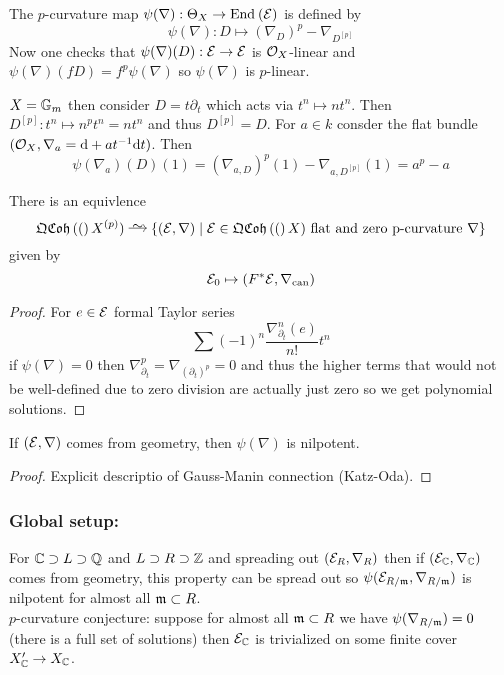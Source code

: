 \documentclass[12pt]{article}
\begin{document}
\begin{defn}
The $p$-curvature map $\psi(\nabla) : \Theta_X \to \mathrm{End}_{} \left( \mathcal{E} \right)$ is defined by
\[ \psi(\nabla) : D \mapsto (\nabla_D)^p - \nabla_{D^{[p]}} \]
Now one checks that $\psi(\nabla)(D) : \mathcal{E} \to \mathcal{E}$ is $\mathcal{O}_{X}$-linear and $\psi(\nabla)(f D) = f^p \psi(\nabla)$ so $\psi(\nabla)$ is $p$-linear.
\end{defn}

\begin{example}
$X = \mathbb{G}_m$ then consider $D = t \partial_t$ which acts via $t^n \mapsto n t^n$. Then $D^{[p]} : t^n \mapsto n^p t^n = n t^n$ and thus $D^{[p]} = D$. For $a \in k$ consder the flat bundle $(\mathcal{O}_{X}, \nabla_a = \mathrm{d} + a t^{-1} \mathrm{d}{t})$. Then
\[ \psi(\nabla_a)(D)(1) = (\nabla_{a,D})^p(1) - \nabla_{a,D^{[p]}}(1) = a^p - a \]
\end{example}

\begin{theorem}
There is an equivlence
\[ \QCoh(X^{(p)}) \iso \{ (\E, \nabla) \mid \E \in \QCoh(X) \text{ flat and zero p-curvature } \nabla \} \]
given by
\[ \mathcal{E}_0 \mapsto (F^* \mathcal{E}, \nabla_{\mathrm{can}}) \]
\end{theorem}

\begin{proof}
For $e \in \mathcal{E}$ formal Taylor series
\[ \sum (-1)^n \frac{\nabla^n_{\partial_t}(e)}{n!} t^n \]
if $\psi(\nabla) = 0$ then $\nabla^p_{\partial_t} = \nabla_{(\partial_t)^p} = 0$ and thus the higher terms that would not be well-defined due to zero division are actually just zero so we get polynomial solutions.
\end{proof}

\begin{theorem}
If $(\mathcal{E}, \nabla)$ comes from geometry, then $\psi(\nabla)$ is nilpotent.
\end{theorem}

\begin{proof}
Explicit descriptio of Gauss-Manin connection (Katz-Oda). 
\end{proof}

\subsubsection{Global setup:}

For $\mathbb{C} \supset L \supset \mathbb{Q}$ and $L \supset R \supset \mathbb{Z}$ and spreading out $(\mathcal{E}_R, \nabla_R)$ then if $(\mathcal{E}_{\mathbb{C}}, \nabla_{\mathbb{C}})$ comes from geometry, this property can be spread out so $\psi(\mathcal{E}_{R/\mathfrak{m}}, \nabla_{R/\mathfrak{m}})$ is nilpotent for almost all $\mathfrak{m} \subset R$. 
\\
$p$-curvature conjecture: suppose for almost all $\mathfrak{m} \subset R$ we have $\psi(\nabla_{R/\mathfrak{m}}) = 0$ (there is a full set of solutions) then $\mathcal{E}_{\mathbb{C}}$ is trivialized on some finite \etale cover $X'_{\mathbb{C}} \to X_{\mathbb{C}}$. 
\end{document}

